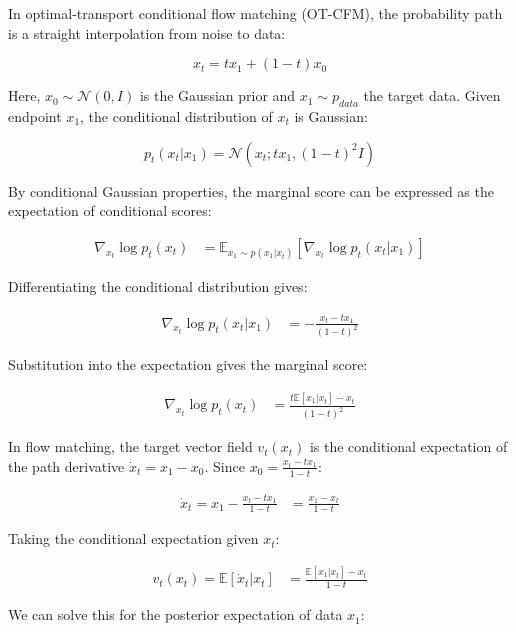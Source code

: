 In optimal-transport conditional flow matching (OT-CFM), the probability path is a straight interpolation from noise to data:

\[
x_t=t x_1+(1-t)x_0
\]

Here, \(x_0\sim\mathcal{N}(0,I)\) is the Gaussian prior and \(x_1\sim p_{data}\) the target data. Given endpoint \(x_1\), the conditional distribution of \(x_t\) is Gaussian:

\[
p_t(x_t|x_1)=\mathcal{N}\left(x_t;t x_1,(1-t)^2I\right)
\]

By conditional Gaussian properties, the marginal score can be expressed as the expectation of conditional scores:

\[
\begin{aligned}
\nabla_{x_t}\log p_t(x_t)
&=
\mathbb{E}_{x_1\sim p(x_1|x_t)}
\left[
\nabla_{x_t}\log p_t(x_t|x_1)
\right]
\end{aligned}
\]

Differentiating the conditional distribution gives:

\[
\begin{aligned}
\nabla_{x_t}\log p_t(x_t|x_1)
&= -\frac{x_t-tx_1}{(1-t)^2}
\end{aligned}
\]

Substitution into the expectation gives the marginal score:

\[
\begin{aligned}
\nabla_{x_t}\log p_t(x_t)
&=
\frac{t\mathbb{E}[x_1|x_t]-x_t}{(1-t)^2}
\end{aligned}
\]

In flow matching, the target vector field \(v_t(x_t)\) is the conditional expectation of the path derivative \(\dot{x}_t=x_1-x_0\). Since \(x_0=\frac{x_t-tx_1}{1-t}\):

\[
\begin{aligned}
\dot{x}_t=x_1-\frac{x_t-tx_1}{1-t}
&=
\frac{x_1-x_t}{1-t}
\end{aligned}
\]

Taking the conditional expectation given \(x_t\):

\[
\begin{aligned}
v_t(x_t)=\mathbb{E}[\dot{x}_t|x_t]
&=
\frac{\mathbb{E}[x_1|x_t]-x_t}{1-t}
\end{aligned}
\]

We can solve this for the posterior expectation of data \(x_1\):

